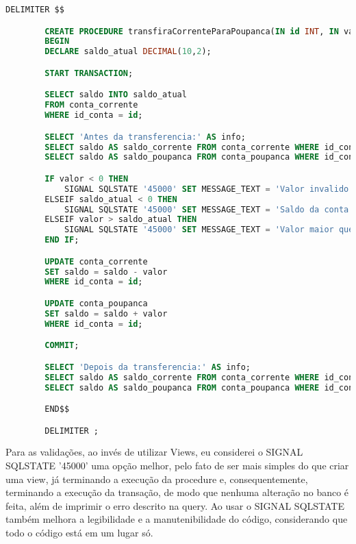 \documentclass{article}
\begin{document}
    \begin{lstlisting}[language=SQL]
        DELIMITER $$

        CREATE PROCEDURE transfiraCorrenteParaPoupanca(IN id INT, IN valor DECIMAL(10,2))
        BEGIN
        DECLARE saldo_atual DECIMAL(10,2);

        START TRANSACTION;

        SELECT saldo INTO saldo_atual
        FROM conta_corrente
        WHERE id_conta = id;

        SELECT 'Antes da transferencia:' AS info;
        SELECT saldo AS saldo_corrente FROM conta_corrente WHERE id_conta = id;
        SELECT saldo AS saldo_poupanca FROM conta_poupanca WHERE id_conta = id;

        IF valor < 0 THEN
            SIGNAL SQLSTATE '45000' SET MESSAGE_TEXT = 'Valor invalido: nao pode ser negativo';
        ELSEIF saldo_atual < 0 THEN
            SIGNAL SQLSTATE '45000' SET MESSAGE_TEXT = 'Saldo da conta corrente esta negativo';
        ELSEIF valor > saldo_atual THEN
            SIGNAL SQLSTATE '45000' SET MESSAGE_TEXT = 'Valor maior que o saldo disponivel';
        END IF;

        UPDATE conta_corrente 
        SET saldo = saldo - valor
        WHERE id_conta = id;

        UPDATE conta_poupanca
        SET saldo = saldo + valor
        WHERE id_conta = id;

        COMMIT;

        SELECT 'Depois da transferencia:' AS info;
        SELECT saldo AS saldo_corrente FROM conta_corrente WHERE id_conta = id;
        SELECT saldo AS saldo_poupanca FROM conta_poupanca WHERE id_conta = id;

        END$$

        DELIMITER ;
    \end{lstlisting}

    Para as validações, ao invés de utilizar Views, eu considerei o SIGNAL SQLSTATE '45000' uma opção melhor, pelo fato de ser mais simples do que criar uma view, já terminando a execução da procedure e, consequentemente, terminando a execução da transação, de modo que nenhuma alteração no banco é feita, além de imprimir o erro descrito na query. Ao usar o SIGNAL SQLSTATE também melhora a legibilidade e a manutenibilidade do código, considerando que todo o código está em um lugar só.
\end{document}
